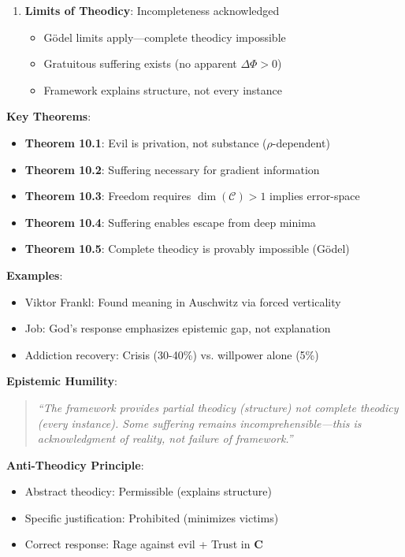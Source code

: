 \documentclass[11pt,a4paper]{article}
\theoremstyle{definition}
\theoremstyle{remark}
\newcommand{\CC}{\mathcal{C}}
\begin{document}
\begin{small}
\begin{enumerate}
\begin{mdframed}[backgroundcolor=green!10,linewidth=2pt,linecolor=green!70!black]
\begin{enumerate}[nosep]
\begin{itemize}[nosep]
            \item Success rate: 30-40\% (crisis-catalyzed) vs. 5\% (willpower alone)
        \end{itemize}
    \item \textbf{Limits of Theodicy}: Incompleteness acknowledged
        \begin{itemize}[nosep]
            \item Gödel limits apply—complete theodicy impossible
            \item Gratuitous suffering exists (no apparent \(\Delta \Phi > 0\))
            \item Framework explains structure, not every instance
        \end{itemize}
\end{enumerate}

\textbf{Key Theorems}:
\begin{itemize}[nosep]
    \item \textbf{Theorem 10.1}: Evil is privation, not substance (\(\rho\)-dependent)
    \item \textbf{Theorem 10.2}: Suffering necessary for gradient information
    \item \textbf{Theorem 10.3}: Freedom requires \(\dim(\CC) > 1\) implies error-space
    \item \textbf{Theorem 10.4}: Suffering enables escape from deep minima
    \item \textbf{Theorem 10.5}: Complete theodicy is provably impossible (Gödel)
\end{itemize}

\textbf{Examples}:
\begin{itemize}[nosep]
    \item Viktor Frankl: Found meaning in Auschwitz via forced verticality
    \item Job: God's response emphasizes epistemic gap, not explanation
    \item Addiction recovery: Crisis (30-40\%) vs. willpower alone (5\%)
\end{itemize}

\textbf{Epistemic Humility}:
\begin{quote}
\textit{``The framework provides partial theodicy (structure) not complete theodicy (every instance). Some suffering remains incomprehensible—this is acknowledgment of reality, not failure of framework.''}
\end{quote}

\textbf{Anti-Theodicy Principle}:
\begin{itemize}[nosep]
    \item Abstract theodicy: Permissible (explains structure)
    \item Specific justification: Prohibited (minimizes victims)
    \item Correct response: Rage against evil + Trust in \(\mathbf{C}\)
\end{itemize}


\end{mdframed}
\end{enumerate}
\end{small}
\end{document}

